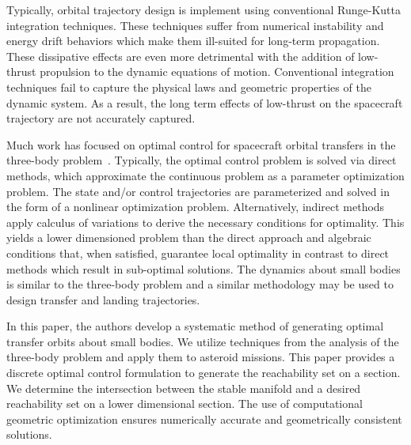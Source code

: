 \documentclass[letterpaper, preprint, paper,11pt]{AAS}	%
\begin{document}
Typically, orbital trajectory design is implement using conventional Runge-Kutta integration techniques.
These techniques suffer from numerical instability and energy drift behaviors which make them ill-suited for long-term propagation.
These dissipative effects are even more detrimental with the addition of low-thrust propulsion to the dynamic equations of motion.
Conventional integration techniques fail to capture the physical laws and geometric properties of the dynamic system.
As a result, the long term effects of low-thrust on the spacecraft trajectory are not accurately captured. 

Much work has focused on optimal control for spacecraft orbital transfers in the three-body problem~\cite{mingotti2011,grebow2011}.
Typically, the optimal control problem is solved via direct methods, which approximate the continuous problem as a parameter optimization problem.
The state and/or control trajectories are parameterized and solved in the form of a nonlinear optimization problem.
Alternatively, indirect methods apply calculus of variations to derive the necessary conditions for optimality. 
This yields a lower dimensioned problem than the direct approach and algebraic conditions that, when satisfied, guarantee local optimality in contrast to direct methods which result in sub-optimal solutions.
The dynamics about small bodies is similar to the three-body problem and a similar methodology may be used to design transfer and landing trajectories.

In this paper, the authors develop a systematic method of generating optimal transfer orbits about small bodies.
We utilize techniques from the analysis of the three-body problem and apply them to asteroid missions.
This paper provides a discrete optimal control formulation to generate the reachability set on a \Poincare section.
We determine the intersection between the stable manifold and a desired reachability set on a lower dimensional \Poincare section.
The use of computational geometric optimization ensures numerically accurate and geometrically consistent solutions.
\end{document}
